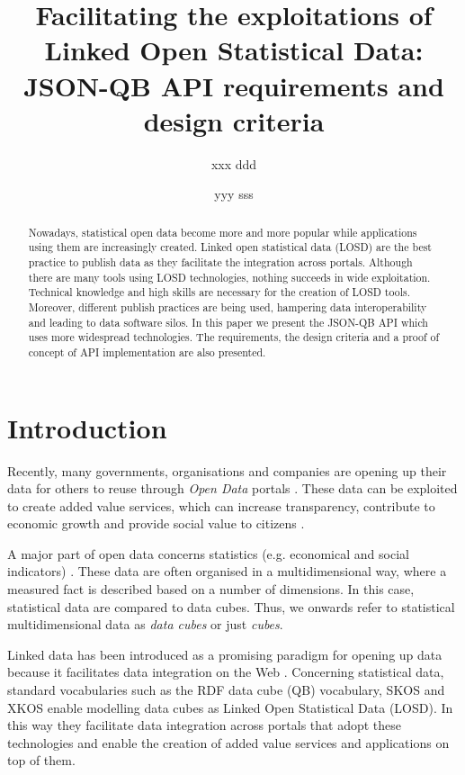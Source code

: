 \documentclass{llncs}
\begin{document}
\title{Facilitating the exploitations of Linked Open Statistical Data: JSON-QB API requirements and design criteria}

\author{xxx ddd \and yyy sss}

\maketitle

\begin{abstract}

Nowadays, statistical open data become more and more popular while applications using them are increasingly created. Linked open statistical data (LOSD) are the best practice to publish data as they facilitate the integration across portals. Although there are many tools using LOSD technologies, nothing succeeds in wide exploitation. Technical knowledge and high skills are necessary for the creation of LOSD tools. Moreover, different publish practices are being used, hampering data interoperability and leading to data software silos. In this paper we present the JSON-QB API which uses more widespread technologies. The requirements, the design criteria and a proof of concept of API implementation are also presented.  

\end{abstract}

\section{Introduction}\label{sec:intro}

Recently, many governments, organisations and companies are opening up their data for others to reuse through \textit{Open Data} portals  \cite{Kalampokis:2011:IJWET}. These data can be exploited to create added value services, which can increase transparency, contribute to economic growth and provide social value to citizens \cite{Janssen:2012}.

A major part of open data concerns statistics (e.g. economical and social indicators) \cite{Capadisli:2013}. These data are often organised in a multidimensional way, where a measured fact is described based on a number of dimensions. In this case, statistical data are compared to data cubes. Thus, we onwards refer to statistical multidimensional data as \textit{data cubes} or just \textit{cubes}.

Linked data has been introduced as a promising paradigm for opening up data because it facilitates data integration on the Web \cite{Bizer:2009}. Concerning statistical data, standard vocabularies such as the RDF data cube (QB) vocabulary\cite{Cyganiak:2014:W3C}, SKOS\cite{Miles:2009:W3C} and XKOS\cite{XKOS} enable modelling data cubes as Linked Open Statistical Data (LOSD). In this way they facilitate data integration across portals that adopt these technologies and enable the creation of added value services and applications on top of them.
\end{document}

